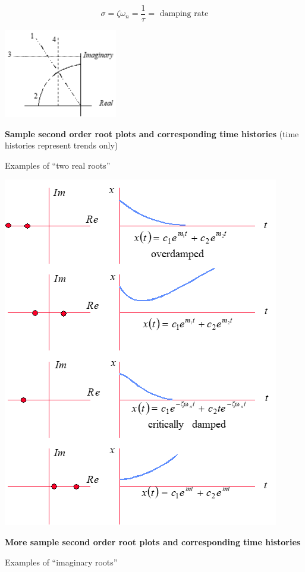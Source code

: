 \documentclass[
]{book}
\begin{document}
\[
  \sigma = \zeta \omega_n = \frac{1}{\tau} = \text{ damping rate}
\]

\includegraphics{media/08/image106.png}

\textbf{Sample second order root plots and corresponding time histories}
(time histories represent trends only)

Examples of ``two real roots''

\includegraphics{media/08/image107.png}

\textbf{More sample second order root plots and corresponding time histories}

Examples of ``imaginary roots''
\end{document}
